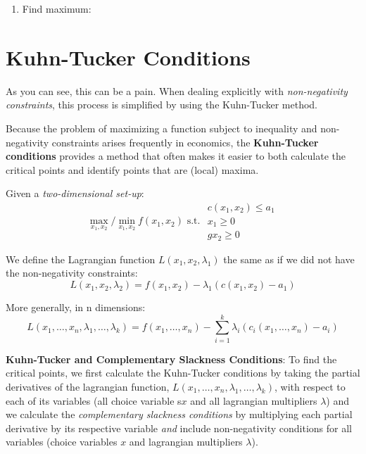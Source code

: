 \documentclass[
]{book}
\providecommand{\tightlist}{%
  \setlength{\itemsep}{0pt}\setlength{\parskip}{0pt}}
\theoremstyle{definition}
\theoremstyle{definition}
\theoremstyle{definition}
\theoremstyle{definition}
\theoremstyle{remark}
\begin{document}

\begin{enumerate}
\def\labelenumi{\arabic{enumi}.}
\setcounter{enumi}{4}
\tightlist
\item
  Find maximum: \phantom{Looking at the values of $f(x_1,x_2)$ at the critical points, we see that the constrained maximum is located at $(x_1, x_2) = (0,0)$, which is the same as the unconstrained max.  The constrained minimum is located at $(x_1, x_2) = (0,4)$, while there is no unconstrained minimum for this problem.}
\end{enumerate}

\hypertarget{kuhn-tucker-conditions}{%
\section{Kuhn-Tucker Conditions}\label{kuhn-tucker-conditions}}

As you can see, this can be a pain. When dealing explicitly with \emph{non-negativity constraints}, this process is simplified by using the Kuhn-Tucker method.

Because the problem of maximizing a function subject to inequality and non-negativity constraints arises frequently in economics, the \textbf{Kuhn-Tucker conditions} provides a method that often makes it easier to both calculate the critical points and identify points that are (local) maxima.

Given a \emph{two-dimensional set-up}:
\[\max_{x_1,x_2}/\min_{x_1,x_2} f(x_1,x_2) \text{ s.t. }
\begin{array}{l}
c(x_1,x_2) \le a_1\\
x_1 \ge 0 \\
gx_2 \ge 0
\end{array}\]

We define the Lagrangian function \(L(x_1,x_2,\lambda_1)\) the same as if we did not have the non-negativity constraints:
\[L(x_1,x_2,\lambda_2) = f(x_1,x_2) - \lambda_1(c(x_1,x_2) - a_1)\]

More generally, in n dimensions:
\[ L(x_1, \dots, x_n, \lambda_1, \dots, \lambda_k) = f(x_1, \dots, x_n) - \sum_{i=1}^k\lambda_i(c_i(x_1,\dots, x_n) - a_i)\]

\textbf{Kuhn-Tucker and Complementary Slackness Conditions}: To find the critical points, we first calculate the Kuhn-Tucker conditions by taking the partial derivatives of the lagrangian function, \(L(x_1,\dots,x_n,\lambda_1,\dots,\lambda_k)\), with respect to each of its variables (all choice variable s\(x\) and all lagrangian multipliers \(\lambda\)) and we calculate the \emph{complementary slackness conditions} by multiplying each partial derivative by its respective variable \emph{and} include non-negativity conditions for all variables (choice variables \(x\) and lagrangian multipliers \(\lambda\)).
\end{document}

